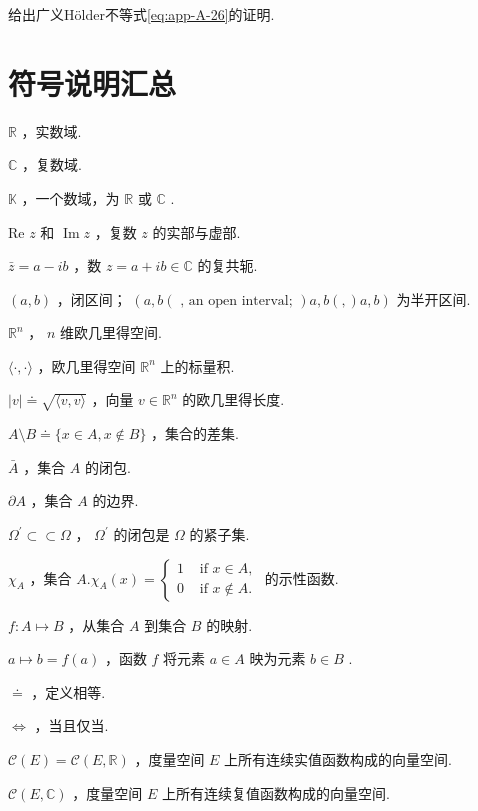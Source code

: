 \begin{rbhw}
给出广义Hölder不等式\eqref{eq:app-A-26}的证明.
\end{rbhw}

\chapter{符号说明汇总}

$\mathbb{R}$ ，实数域.

$\mathbb{C}$ ，复数域.

$\mathbb{K}$ ，一个数域，为 $\mathbb{R}$ 或 $\mathbb{C}$ .

Re $z$ 和 $\operatorname{Im}z$ ，复数 $z$ 的实部与虚部.

$\bar{z} = a - {ib}$ ，数 $z = a + {ib} \in  \mathbb{C}$ 的复共轭.

$\left(  {a,b}\right)$ ，闭区间； $( a,b\left(  \text{ , an open interval; }\right)  a,b( ,) a,b)$ 为半开区间.

${\mathbb{R}}^{n}$ ， $n$ 维欧几里得空间.

$\langle  \cdot  , \cdot  \rangle$ ，欧几里得空间 ${\mathbb{R}}^{n}$ 上的标量积.

$\left| v\right|  \doteq  \sqrt{\langle v,v\rangle }$ ，向量 $v \in  {\mathbb{R}}^{n}$ 的欧几里得长度.

$A \setminus  B \doteq  \{ x \in  A,x \notin  B\}$ ，集合的差集.

$\bar{A}$ ，集合 $A$ 的闭包.

$\partial A$ ，集合 $A$ 的边界.

${\Omega }^{\prime } \subset   \subset  \Omega$ ， ${\Omega }^{\prime }$ 的闭包是 $\Omega$ 的紧子集.

${\chi }_{A}$ ，集合 $A.{\chi }_{A}\left( x\right)  = \left\{  \begin{array}{ll} 1 & \text{ if }x \in  A, \\  0 & \text{ if }x \notin  A. \end{array}\right.$ 的示性函数.

$f : A \mapsto  B$ ，从集合 $A$ 到集合 $B$ 的映射.

$a \mapsto  b = f\left( a\right)$ ，函数 $f$ 将元素 $a \in  A$ 映为元素 $b \in  B$ .

$\doteq$ ，定义相等.

$\Leftrightarrow$ ，当且仅当.

$\mathcal{C}\left( E\right)  = \mathcal{C}\left( {E,\mathbb{R}}\right)$ ，度量空间 $E$ 上所有连续实值函数构成的向量空间.

$\mathcal{C}\left( {E,\mathbb{C}}\right)$ ，度量空间 $E$ 上所有连续复值函数构成的向量空间.

